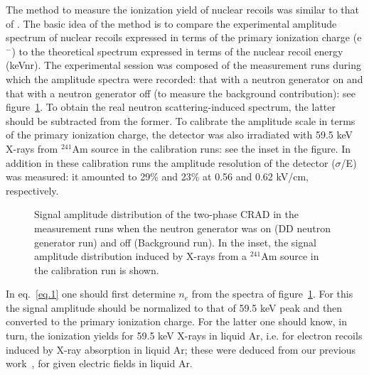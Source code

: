 \documentclass[a4paper,11pt]{article}
\begin{document}
The method to measure the ionization yield of nuclear recoils was similar to that of \cite{IonYield14}. The basic idea of the method is to compare the experimental amplitude spectrum of nuclear recoils expressed in terms of the primary ionization charge (e$^-$) to the theoretical spectrum expressed in terms of the nuclear recoil energy (keVnr). The experimental session was composed of the measurement runs during which the amplitude spectra were recorded: that with a neutron generator on and that with a neutron generator off (to measure the background contribution): see figure~\ref{SpectrRaw}. To obtain the real neutron scattering-induced spectrum, the latter should be subtracted from the former. To calibrate the amplitude scale in terms of the primary ionization charge, the detector was also irradiated with 59.5 keV X-rays from $^{241}$Am source in the calibration runs: see the inset in the figure. In addition in these calibration runs the amplitude resolution of the detector ($\sigma$/E) was measured: it amounted to 29\% and 23\% at 0.56 and 0.62 kV/cm, respectively.
\begin{figure}[ht]
	\caption{Signal amplitude distribution of the two-phase CRAD in the measurement runs when the neutron generator was on (DD neutron generator run) and off (Background run). In the inset, the signal amplitude distribution induced by X-rays from a $^{241}$Am source in the calibration run is shown.}
	\label{SpectrRaw}
\end{figure}

In eq.~\eqref{eq.1} one should first determine $n_e$ from the spectra of figure~\ref{SpectrRaw}. For this the signal amplitude should be normalized to that of 59.5 keV peak and then
converted to the primary ionization charge. For the latter one
should know, in turn, the ionization yields for 59.5 keV X-rays in
liquid Ar, i.e. for electron recoils induced by X-ray absorption in liquid Ar; these were deduced from our previous work~\cite{XRayYield16}, for given electric fields in liquid Ar.
\end{document}
